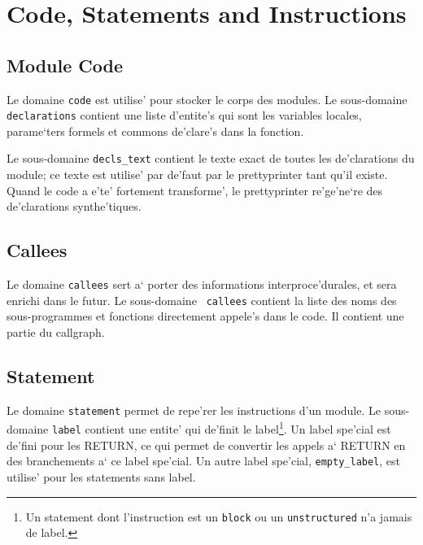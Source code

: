 \section{Code, Statements and Instructions}
\label{code}

\subsection{Module Code}
\label{subsection-code}

{ 
Le domaine \verb/code/ est utilise'
pour stocker le corps des modules. Le sous-domaine \verb/declarations/
contient une liste d'entite's qui sont les variables locales,
parame`ters formels et commons de'clare's dans la fonction.

Le sous-domaine {\tt decls\_text} contient le texte exact de toutes les
de'clarations du module; ce texte est utilise' par de'faut par le
prettyprinter tant qu'il existe. Quand le code a e'te' fortement
transforme', le prettyprinter re'ge'ne`re des de'clarations
synthe'tiques.
}

\subsection{Callees}
\label{subsection-callees}


{ Le domaine {\tt callees} sert a` porter des informations
interproce'durales, et sera enrichi dans le futur.  Le sous-domaine {\tt
callees} contient la liste des noms des sous-programmes et fonctions
directement appele's dans le code. Il contient une partie du callgraph.
}

\subsection{Statement}
\label{subsection-statement}

{}

Le domaine \verb/statement/ permet de
repe'rer les instructions d'un module.  Le sous-domaine \verb/label/
contient une entite' qui de'finit le label\footnote{Un statement dont
l'instruction est un \verb/block/ ou un \verb/unstructured/ n'a jamais
de label.}. Un label spe'cial est de'fini pour les RETURN, ce qui permet
de convertir les appels a` RETURN en des branchements a` ce label
spe'cial. Un autre label spe'cial, \verb/empty_label/, est utilise' pour
les statements sans label.

